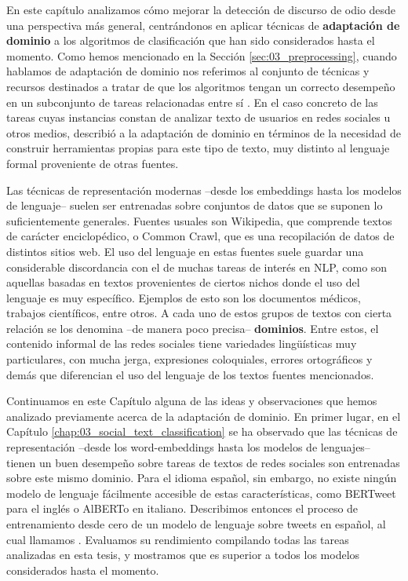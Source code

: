 \label{chap:07_domain_adaptation}
\newcommand{\deacc}[0]{\textbf{deacc}}
\newcommand{\cased}[0]{\textbf{cased}}
\newcommand{\uncased}[0]{\textbf{uncased}}

En este capítulo analizamos cómo mejorar la detección de discurso de odio desde una perspectiva más general, centrándonos en aplicar técnicas de \textbf{adaptación de dominio} a los algoritmos de clasificación que han sido considerados hasta el momento. Como hemos mencionado en la Sección \ref{sec:03_preprocessing}, cuando hablamos de adaptación de dominio nos referimos al conjunto de técnicas y recursos destinados a tratar de que los algoritmos tengan un correcto desempeño en un subconjunto de tareas relacionadas entre sí \cite{goodfellow2016deep}. En el caso concreto de las tareas cuyas instancias constan de analizar texto de usuarios en redes sociales u otros medios, \citet{eisenstein2013bad} describió a la adaptación de dominio en términos de la necesidad de construir herramientas propias para este tipo de texto, muy distinto al lenguaje formal proveniente de otras fuentes.

Las técnicas de representación modernas --desde los embeddings hasta los modelos de lenguaje-- suelen ser entrenadas sobre conjuntos de datos que se suponen lo suficientemente generales. Fuentes usuales son Wikipedia, que comprende textos de carácter enciclopédico, o Common Crawl, que es una recopilación de datos de distintos sitios web. El uso del lenguaje en estas fuentes suele guardar una considerable discordancia con el de muchas tareas de interés en NLP, como son aquellas basadas en textos provenientes de ciertos nichos donde el uso del lenguaje es muy específico. Ejemplos de esto son los documentos médicos, trabajos científicos, entre otros. A cada uno de estos grupos de textos con cierta relación se los denomina --de manera poco precisa-- \textbf{dominios}. Entre estos, el contenido informal de las redes sociales tiene variedades lingüísticas muy particulares, con mucha jerga, expresiones coloquiales, errores ortográficos y demás que diferencian el uso del lenguaje de los textos fuentes mencionados.

Continuamos en este Capítulo alguna de las ideas y observaciones que hemos analizado previamente acerca de la adaptación de dominio. En primer lugar, en el Capítulo \ref{chap:03_social_text_classification} se ha observado que las técnicas de representación --desde los word-embeddings hasta los modelos de lenguajes-- tienen un buen desempeño sobre tareas de textos de redes sociales son entrenadas sobre este mismo dominio. Para el idioma español, sin embargo, no existe ningún modelo de lenguaje fácilmente accesible de estas características, como BERTweet para el inglés o AlBERTo en italiano. Describimos entonces el proceso de entrenamiento desde cero de un modelo de lenguaje sobre tweets en español, al cual llamamos \robertuito{}. Evaluamos su rendimiento compilando todas las tareas analizadas en esta tesis, y mostramos que es superior a todos los modelos considerados hasta el momento.

